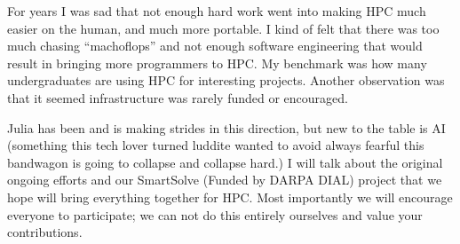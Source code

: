 For years I was sad that not enough hard work went into making HPC much easier on the human, and much more portable. I kind of felt that there was too much chasing “machoflops” and not enough software engineering that would result in bringing more programmers to HPC. My benchmark was how many undergraduates are using HPC for interesting projects. Another observation was that it seemed infrastructure was rarely funded or encouraged.

Julia has been and is making strides in this direction, but new to the table is AI (something this tech lover turned luddite wanted to avoid always fearful this bandwagon is going to collapse and collapse hard.) I will talk about the original ongoing efforts and our SmartSolve (Funded by DARPA DIAL) project that we hope will bring everything together for HPC. Most importantly we will encourage everyone to participate; we can not do this entirely ourselves and value your contributions.
